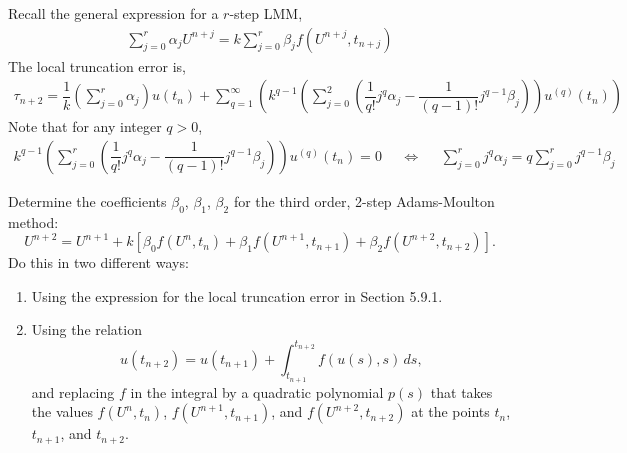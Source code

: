 \documentclass[10pt]{article}
\begin{document}
\maketitle



\begin{problem}[Preliminaries]
Recall the general expression for a \( r \)-step LMM,
\begin{align*}
    \sum_{j=0}^{r} \alpha_j U^{n+j} = k \sum_{j=0}^{r} \beta_j f(U^{n+j},t_{n+j})
\end{align*}
The local truncation error is,
\begin{align*}
    \tau_{n+2} = \dfrac{1}{k}\left( \sum_{j=0}^{r} \alpha_j \right)u(t_n) + \sum_{q=1}^{\infty}\left(k^{q-1} \left(\sum_{j=0}^{2} \left(\dfrac{1}{q!}j^q\alpha_j -\dfrac{1}{(q-1)!}j^{q-1} \beta_j\right)\right)u^{(q)}(t_n)\right)
\end{align*}
Note that for any integer \( q>0 \),
\begin{align*}
    k^{q-1} \left(\sum_{j=0}^{r} \left(\dfrac{1}{q!}j^q\alpha_j -\dfrac{1}{(q-1)!}j^{q-1} \beta_j\right)\right)u^{(q)}(t_n) = 0
     && \Longleftrightarrow &&
    \sum_{j=0}^{r} j^q \alpha_j = q\sum_{j=0}^{r}j^{q-1} \beta_j
\end{align*}

\end{problem}


\begin{problem}[Problem 1]
Determine the coefficients \(\beta_0\), \(\beta_1\), \(\beta_2\) for the third order, 2-step Adams-Moulton method:
\[
U^{n+2} = U^{n+1} + k [ \beta_0 f( U^n , t_n ) + \beta_1 f( U^{n+1} , t_{n+1} ) +
\beta_2 f( U^{n+2} , t_{n+2} ) ] .
\]
Do this in two different ways:
\begin{enumerate}[label=(\alph*)]
\item Using the expression for the local truncation error in Section 5.9.1.
\item Using the relation
\[
u( t_{n+2} ) = u( t_{n+1} ) + \int_{t_{n+1}}^{t_{n+2}} f( u(s),s )\,ds ,
\]
and replacing \(f\) in the integral by a quadratic polynomial \(p(s)\) that takes the values
\(f( U^n , t_n )\), \(f( U^{n+1} , t_{n+1} )\), and \(f( U^{n+2} , t_{n+2} )\) at the points \(t_n\),
\(t_{n+1}\), and \(t_{n+2}\).
\end{enumerate}
\end{problem}
\end{document}
